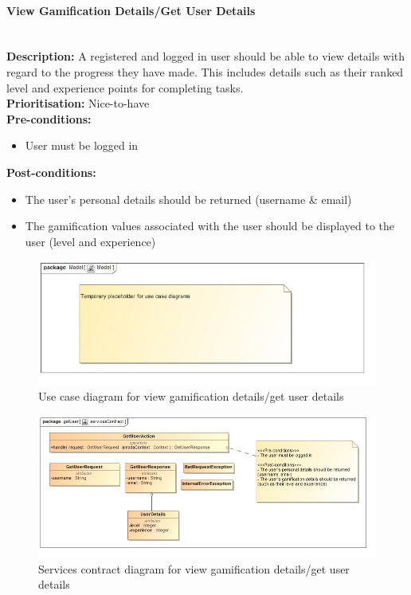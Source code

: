 \documentclass{article}
\begin{document}
	\paragraph{View Gamification Details/Get User Details}\mbox{}\\
		\textbf{Description:} A registered and logged in user should be able to view details with regard to the progress they have made. This includes details such as their ranked level and experience points for completing tasks.\\
		\textbf{Prioritisation:} Nice-to-have\\		
		\textbf{Pre-conditions:}
			\begin{itemize}
				\item User must be logged in
			\end{itemize}
		\textbf{Post-conditions:}
			\begin{itemize}
				\item The user's personal details should be returned (username \& email)
				\item The gamification values associated with the user should be displayed to the user (level and experience)
			\end{itemize}

		\begin{figure}[H]
			\includegraphics[width=\linewidth]{images/tempUseCase.jpg}
			\caption{Use case diagram for view gamification details/get user details}
		\end{figure}
		
		\begin{figure}[H]
			\includegraphics[width=\linewidth]{images/ServicesContracts/getUser.jpg}
			\caption{Services contract diagram for view gamification details/get user details}
		\end{figure}
\end{document}
